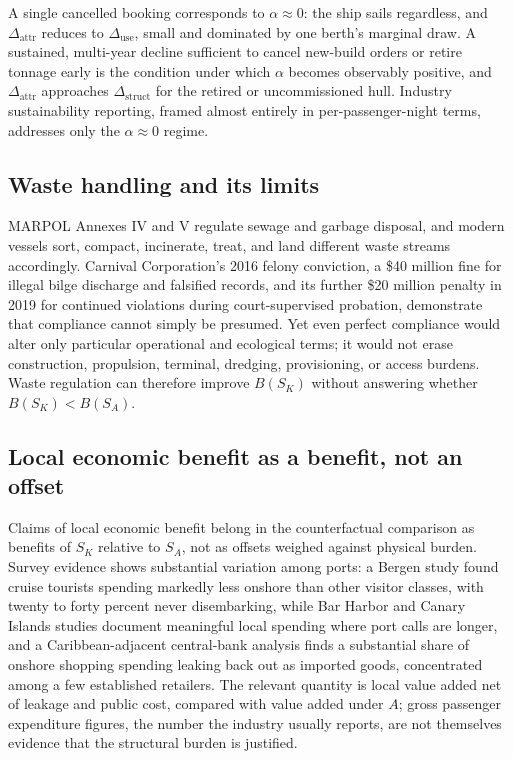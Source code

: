 \documentclass[11pt]{article}
\begin{document}
A single cancelled booking corresponds to $\alpha \approx 0$: the ship sails regardless, and $\Delta_{\text{attr}}$ reduces to $\Delta_{\text{use}}$, small and dominated by one berth's marginal draw. A sustained, multi-year decline sufficient to cancel new-build orders or retire tonnage early is the condition under which $\alpha$ becomes observably positive, and $\Delta_{\text{attr}}$ approaches $\Delta_{\text{struct}}$ for the retired or uncommissioned hull. Industry sustainability reporting, framed almost entirely in per-passenger-night terms, addresses only the $\alpha \approx 0$ regime.

\subsection{Waste handling and its limits}

MARPOL Annexes IV and V regulate sewage and garbage disposal, and modern vessels sort, compact, incinerate, treat, and land different waste streams accordingly. Carnival Corporation's 2016 felony conviction, a \$40 million fine for illegal bilge discharge and falsified records, and its further \$20 million penalty in 2019 for continued violations during court-supervised probation, demonstrate that compliance cannot simply be presumed. Yet even perfect compliance would alter only particular operational and ecological terms; it would not erase construction, propulsion, terminal, dredging, provisioning, or access burdens. Waste regulation can therefore improve $B(S_K)$ without answering whether $B(S_K) < B(S_A)$.

\subsection{Local economic benefit as a benefit, not an offset}

Claims of local economic benefit belong in the counterfactual comparison as benefits of $S_K$ relative to $S_A$, not as offsets weighed against physical burden. Survey evidence shows substantial variation among ports: a Bergen study found cruise tourists spending markedly less onshore than other visitor classes, with twenty to forty percent never disembarking, while Bar Harbor and Canary Islands studies document meaningful local spending where port calls are longer, and a Caribbean-adjacent central-bank analysis finds a substantial share of onshore shopping spending leaking back out as imported goods, concentrated among a few established retailers. The relevant quantity is local value added net of leakage and public cost, compared with value added under $A$; gross passenger expenditure figures, the number the industry usually reports, are not themselves evidence that the structural burden is justified.
\end{document}
